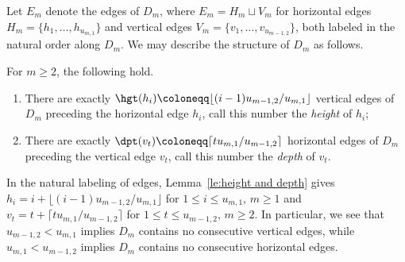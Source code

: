 Let $E_m$ denote the edges of $D_m$, where $E_m=H_m\sqcup V_m$ for horizontal edges $H_m=\{h_1,\ldots,h_{u_{m,1}}\}$ and vertical edges $V_m=\{v_1,\ldots,v_{u_{m-1,2}}\}$, both labeled in the natural order along $D_m$. 
We may describe the structure of $D_m$ as follows.
\begin{lemma}
 \label{le:height and depth}
 For $m\ge2$, the following hold.
 \begin{enumerate}[label=(\alph*)]
 \item There are exactly $\hgt(h_i)\coloneqq \lfloor (i-1)u_{m-1,2}/u_{m,1}\rfloor$ vertical edges of $D_m$ preceding the horizontal edge $h_i$, call this number the \emph{height} of $h_i$;
 \item There are exactly $\dpt(v_t)\coloneqq \lceil tu_{m,1}/u_{m-1,2}\rceil$ horizontal edges of $D_m$ preceding the vertical edge $v_t$, call this number the \emph{depth} of $v_t$.
 \end{enumerate}
\end{lemma}
In the natural labeling of edges, Lemma~\ref{le:height and depth} gives $h_i=i+\lfloor (i-1)u_{m-1,2}/u_{m,1}\rfloor$ for $1\le i\le u_{m,1}$, $m\ge1$ and $v_t=t+\lceil tu_{m,1}/u_{m-1,2}\rceil$ for $1\le t\le u_{m-1,2}$, $m\ge2$. 
In particular, we see that $u_{m-1,2}<u_{m,1}$ implies $D_m$ contains no consecutive vertical edges, while $u_{m,1}<u_{m-1,2}$ implies $D_m$ contains no consecutive horizontal edges. 

